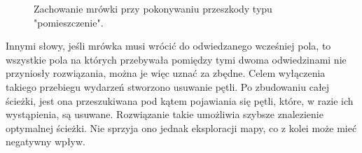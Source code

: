 \documentclass[printmode, openany, oneside, eng]{mgr}
\begin{document}
\begin{itemize}
\begin{figure}[H]
\caption{Zachowanie mrówki przy pokonywaniu przeszkody typu "pomieszczenie".}
\label{fig:eksperyment}
\end{figure}
 Innymi słowy, jeśli mrówka musi wrócić do odwiedzanego wcześniej pola, to wszystkie pola na których przebywała pomiędzy tymi dwoma odwiedzinami nie przyniosły rozwiązania, można je więc uznać za zbędne. Celem wyłączenia takiego przebiegu wydarzeń stworzono usuwanie pętli. Po zbudowaniu całej ścieżki, jest ona przeszukiwana pod kątem pojawiania się pętli, które, w razie ich wystąpienia, są usuwane. 
\newline Rozwiązanie takie umożliwia szybsze znalezienie optymalnej ścieżki. Nie sprzyja ono jednak eksploracji mapy, co z kolei może mieć negatywny wpływ.
\end{itemize}
\end{document}
